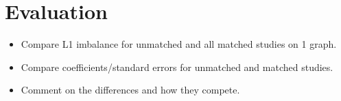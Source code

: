 \chapter{Evaluation}


\begin{itemize}
    \item Compare L1 imbalance for unmatched and all matched studies on 1 graph.
    \item Compare coefficients/standard errors for unmatched and matched studies.
    \item Comment on the differences and how they compete.
\end{itemize}